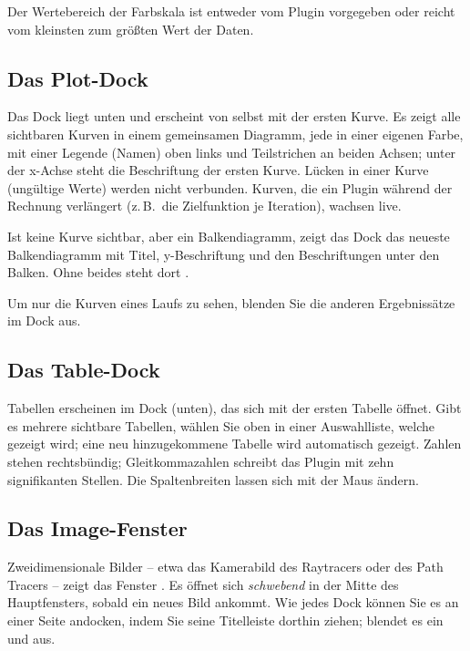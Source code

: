 Der Wertebereich der Farbskala ist entweder vom Plugin vorgegeben oder reicht vom kleinsten
zum größten Wert der Daten.

\subsection{Das Plot-Dock}\label{sec:plot-dock}

Das Dock  liegt unten und erscheint von selbst mit der ersten Kurve. Es zeigt alle
sichtbaren Kurven in einem gemeinsamen Diagramm, jede in einer eigenen Farbe, mit einer Legende
(Namen) oben links und Teilstrichen an beiden Achsen; unter der x-Achse steht die Beschriftung
der ersten Kurve. Lücken in einer Kurve (ungültige Werte) werden nicht verbunden. Kurven, die ein
Plugin während der Rechnung verlängert (z.\,B.\ die Zielfunktion je Iteration), wachsen
live.

Ist keine Kurve sichtbar, aber ein Balkendiagramm, zeigt das Dock das neueste Balkendiagramm
mit Titel, y-Beschriftung und den Beschriftungen unter den Balken. Ohne beides steht dort
.

\begin{tipp}
Um nur die Kurven eines Laufs zu sehen, blenden Sie die anderen Ergebnissätze im Dock
 aus.
\end{tipp}

\subsection{Das Table-Dock}\label{sec:table-dock}

Tabellen erscheinen im Dock  (unten), das sich mit der ersten Tabelle öffnet. Gibt
es mehrere sichtbare Tabellen, wählen Sie oben in einer Auswahlliste, welche gezeigt wird; eine
neu hinzugekommene Tabelle wird automatisch gezeigt. Zahlen stehen rechtsbündig; Gleitkommazahlen
schreibt das Plugin mit zehn signifikanten Stellen. Die Spaltenbreiten lassen sich mit der Maus
ändern.

\subsection{Das Image-Fenster}\label{sec:image-fenster}

Zweidimensionale Bilder – etwa das Kamerabild des Raytracers oder des Path Tracers – zeigt das
Fenster . Es öffnet sich \emph{schwebend} in der Mitte des Hauptfensters, sobald ein
neues Bild ankommt. Wie jedes Dock können Sie es an einer Seite andocken, indem Sie seine
Titelleiste dorthin ziehen;  blendet es ein und aus.

